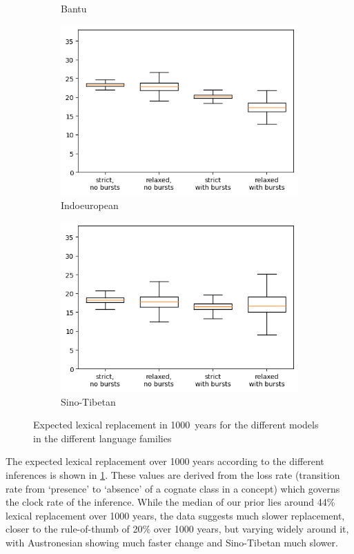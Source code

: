\documentclass[]{rsos}%
\begin{document}
\begin{figure}
\begin{subfigure}{0.4\textwidth}
    \caption{Bantu}
  \end{subfigure}
  \begin{subfigure}{0.4\textwidth}
    \includegraphics[width=\textwidth]{supplement/analysis/indoeuropean_replacement.png}
    \caption{Indoeuropean}
  \end{subfigure}
  \begin{subfigure}{0.4\textwidth}
    \includegraphics[width=\textwidth]{supplement/analysis/sinotibetan_replacement.png}
    \caption{Sino-Tibetan}
  \end{subfigure}
  \caption{Expected lexical replacement in 1000~years for the different models
    in the different language families}\label{f:clock}
\end{figure}

The expected lexical replacement over 1000 years according to the different
inferences is shown in \cref{f:clock}. These values are derived from the loss
rate (transition rate from ‘presence’ to ‘absence’ of a cognate class in a
concept) which governs the clock rate of the inference. While the median of our
prior lies around 44\% lexical replacement over 1000 years, the data suggests
much slower replacement, closer to the \textcite{swadesh1955greater}
rule-of-thumb of 20\% over 1000 years, but varying widely around it, with
Austronesian showing much faster change and Sino-Tibetan much slower.
\end{document}
